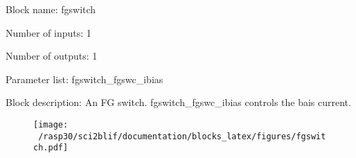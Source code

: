 \pagebreak

Block name: fgswitch

Number of inputs: 1

Number of outputs: 1

Parameter list: fgswitch\_fgswc\_ibias

Block description: 
An FG switch. fgswitch\_fgswc\_ibias controls the bais current.

\begin{figure}[H]  %
\texttt{[image: ~/rasp30/sci2blif/documentation/blocks\_latex/figures/fgswitch.pdf]}
\end{figure}

